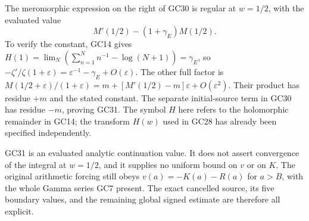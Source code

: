 The meromorphic expression on the right of GC30 is regular at
\(w=1/2\), with the evaluated value
\[
\boxed{M'(1/2)-(1+\gamma_E)M(1/2).}\tag{GC31}
\]
To verify the constant, GC14 gives
\(H(1)=\lim_N(\sum_{n=1}^N n^{-1}-\log(N+1))=\gamma_E\),
so \(-\zeta'/\zeta(1+\varepsilon)=\varepsilon^{-1}-\gamma_E
+O(\varepsilon)\). The other full factor is
\(M(1/2+\varepsilon)/(1+\varepsilon)
=m+[M'(1/2)-m]\varepsilon+O(\varepsilon^2)\).
Their product has residue \(+m\) and the stated constant.
The separate initial-source term in GC30 has residue \(-m\),
proving GC31. The symbol \(H\) here refers to the holomorphic
remainder in GC14; the transform \(H(w)\) used in GC28 has already
been specified independently.

GC31 is an evaluated analytic continuation value. It does not assert
convergence of the integral at \(w=1/2\), and it supplies no uniform
bound on \(v\) or on \(K\). The original arithmetic forcing still
obeys \(v(a)=-K(a)-R(a)\) for \(a>B\), with the whole Gamma series
GC7 present. The exact cancelled source, its five boundary values,
and the remaining global signed estimate are therefore all explicit.
